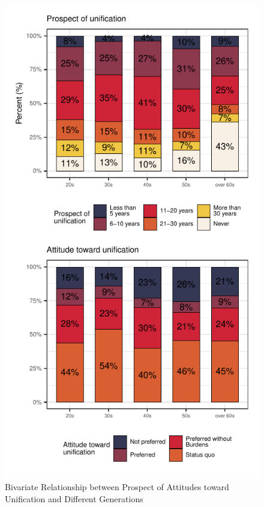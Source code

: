 \documentclass[letterpaper,9pt,twocolumn,twoside,]{pinp}
\begin{document}
\begin{figure}[ht]

{\centering \includegraphics{manuscript_files/figure-latex/fig8-1} 

}

\caption{\label{fig8} Bivariate Relationship between Prospect of Attitudes toward Unification and Different Generations}\label{fig:fig8}
\end{figure}
\end{document}
